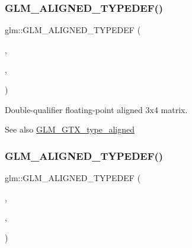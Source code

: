 \subsubsection{\texorpdfstring{G\+L\+M\+\_\+\+A\+L\+I\+G\+N\+E\+D\+\_\+\+T\+Y\+P\+E\+D\+E\+F()}{GLM\_ALIGNED\_TYPEDEF()}\hspace{0.1cm}{\footnotesize\ttfamily [201/209]}}
{\footnotesize\ttfamily glm\+::\+G\+L\+M\+\_\+\+A\+L\+I\+G\+N\+E\+D\+\_\+\+T\+Y\+P\+E\+D\+EF (\begin{DoxyParamCaption}\item[{\mbox{\hyperlink{group__gtc__type__precision_gaddb7f46e5a007c31348305de542e0d52}{f64mat3x4}}}]{,  }\item[{aligned\+\_\+f64mat3x4}]{,  }\item[{32}]{ }\end{DoxyParamCaption})}

Double-\/qualifier floating-\/point aligned 3x4 matrix. \begin{DoxySeeAlso}{See also}
\mbox{\hyperlink{group__gtx__type__aligned}{G\+L\+M\+\_\+\+G\+T\+X\+\_\+type\+\_\+aligned}} 
\end{DoxySeeAlso}
\mbox{\label{group__gtx__type__aligned_ga41e82cd6ac07f912ba2a2d45799dcf0d}} 
\subsubsection{\texorpdfstring{G\+L\+M\+\_\+\+A\+L\+I\+G\+N\+E\+D\+\_\+\+T\+Y\+P\+E\+D\+E\+F()}{GLM\_ALIGNED\_TYPEDEF()}\hspace{0.1cm}{\footnotesize\ttfamily [202/209]}}
{\footnotesize\ttfamily glm\+::\+G\+L\+M\+\_\+\+A\+L\+I\+G\+N\+E\+D\+\_\+\+T\+Y\+P\+E\+D\+EF (\begin{DoxyParamCaption}\item[{\mbox{\hyperlink{group__gtc__type__precision_ga704001c2ed5838498ff61f55995fed3a}{f64mat4x2}}}]{,  }\item[{aligned\+\_\+f64mat4x2}]{,  }\item[{32}]{ }\end{DoxyParamCaption})}

